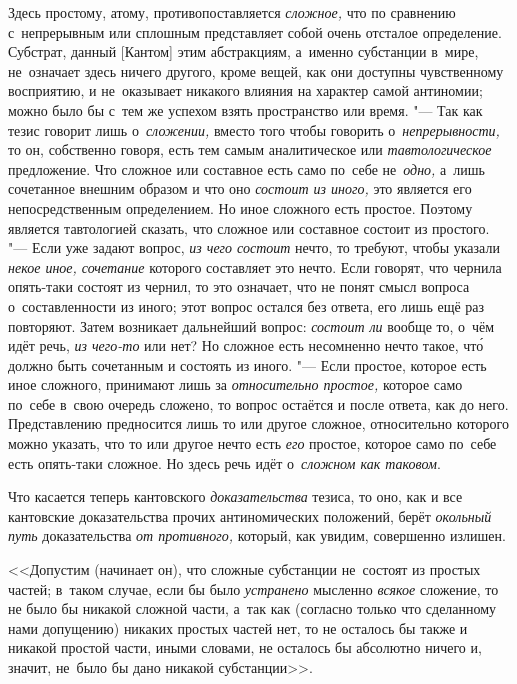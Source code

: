 Здесь простому, атому, противопоставляется {\em сложное,} что по сравнению
с~непрерывным или сплошным представляет собой очень отсталое определение.
Субстрат, данный [Кантом] этим абстракциям, а~именно субстанции в~мире,
не~означает здесь ничего другого, кроме вещей, как они доступны чувственному
восприятию, и не~оказывает никакого влияния на характер самой антиномии; можно
было бы с~тем же успехом взять пространство или время. "--- Так как тезис
говорит лишь о~{\em сложении,} вместо того чтобы говорить
о~{\em непрерывности,} то он, собственно говоря, есть тем самым аналитическое
или {\em тавтологическое} предложение. Что сложное или составное есть само
по~себе не~{\em одно,} а~лишь сочетанное внешним образом и что оно
{\em состоит из иного,} это является его непосредственным определением.
Но иное сложного есть простое. Поэтому является тавтологией сказать, что
сложное или составное состоит из простого. "--- Если уже задают вопрос,
{\em из чего состоит} нечто, то требуют, чтобы указали
{\em некое иное, сочетание} которого составляет это нечто. Если говорят, что
чернила опять-таки состоят из чернил, то это означает, что не понят смысл
вопроса о~составленности из иного; этот вопрос остался без ответа, его лишь
ещё раз повторяют. Затем возникает дальнейший вопрос: {\em состоит ли} вообще
то, о~чём идёт речь, {\em из чего-то} или нет? Но сложное есть несомненно нечто
такое, чт\'{о} должно быть сочетанным и состоять из иного. "--- Если простое,
которое есть иное сложного, принимают лишь за {\em относительно простое,}
которое само по~себе в~свою очередь сложено, то вопрос остаётся и после
ответа, как до него. Представлению предносится лишь то или другое сложное,
относительно которого можно указать, что то или другое нечто есть
{\em его} простое, которое само по~себе есть опять-таки сложное. Но здесь
речь идёт о~{\em сложном как таковом}.

Что касается теперь кантовского {\em доказательства}
тезиса, то оно, как и все кантовские доказательства прочих антиномических
положений, берёт {\em окольный путь} доказательства
{\em от противного,} который, как увидим, совершенно излишен.

<<Допустим (начинает он), что сложные субстанции не~состоят из простых частей;
в~таком случае, если бы было {\em устранено} мысленно {\em всякое} сложение, то
не было бы никакой сложной части, а~так как (согласно только что сделанному
нами допущению) никаких простых частей нет, то не осталось бы также и никакой
простой части, иными словами, не осталось бы абсолютно ничего и, значит,
не~было бы дано никакой субстанции>>.

